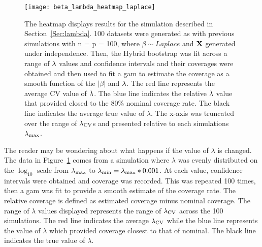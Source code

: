 \begin{figure}[hbtp]
  \texttt{[image: beta\_lambda\_heatmap\_laplace]}
  \caption{\label{Fig:beta_lambda_heatmap_laplace} The heatmap displays results for the simulation described in Section~\ref{Sec:lambda}. 100 datasets were generated as with previous simulations with n = p = 100, where $\beta \sim Laplace$ and $\mathbf{X}$ generated under independence. Then, the Hybrid bootstrap was fit across a range of $\lambda$ values and confidence intervals and their coverages were obtained and then used to fit a gam to estimate the coverage as a smooth function of the $|\beta|$ and $\lambda$. The red line represents the average CV value of $\lambda$. The blue line indicates the relative $\lambda$ value that provided closed to the 80\% nominal coverage rate. The black line indicates the average true value of $\lambda$. The x-axis was truncated over the range of $\lambda_{\textrm{CV}}$s and presented relative to each simulations $\lambda_{\max}$.}
\end{figure}

The reader may be wondering about what happens if the value of $\lambda$ is changed. The data in Figure~\ref{Fig:beta_lambda_heatmap_laplace} comes from a simulation where $\lambda$ was evenly distributed on the $\log_{10}$ scale from $\lambda_{\max}$ to $\lambda_{\min} = \lambda_{\max} * 0.001$. At each value, confidence intervals were obtained and coverage was recorded. This was repeated 100 times, then a gam was fit to provide a smooth estimate of the coverage rate. The relative coverage is defined as estimated coverage minus nominal coverage. The range of $\lambda$ values displayed represents the range of $\lambda_{\textrm{CV}}$ across the 100 simulations. The red line indicates the average $\lambda_{\textrm{CV}}$ while the blue line represents the value of $\lambda$ which provided coverage closest to that of nominal. The black line indicates the true value of $\lambda$.

